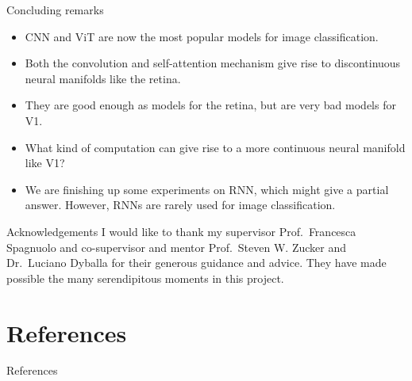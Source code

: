 \documentclass[xcolor={dvipsnames,svgnames}]{beamer}
\begin{document}
\begin{frame}{Concluding remarks}
    \begin{itemize}
        \item CNN and ViT are now the most popular models for image classification. 
        \item Both the convolution and self-attention mechanism give rise to discontinuous neural manifolds like the retina. 
        \item They are good enough as models for the retina, but are very bad models for V1. 
        \item What kind of computation can give rise to a more continuous neural manifold like V1?
        \item We are finishing up some experiments on RNN, which might give a partial answer. However, RNNs are rarely used for image classification.
    \end{itemize}
\end{frame}
\begin{frame}{Acknowledgements}
I would like to thank my supervisor Prof.~Francesca Spagnuolo  and co-supervisor and mentor Prof.~Steven W. Zucker and Dr.~Luciano Dyballa for their generous guidance and advice. They have made possible the many serendipitous moments in this project. 
\end{frame}
\section{References}
\begin{frame}{References}


\end{frame}
\end{document}
